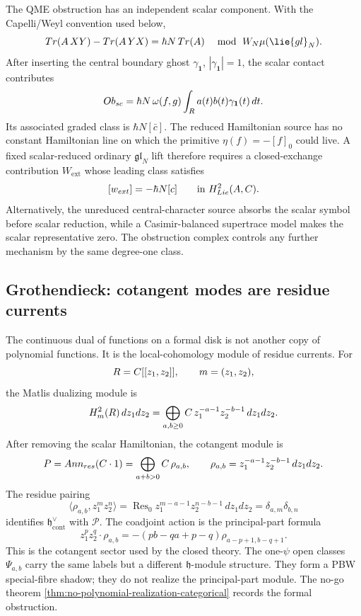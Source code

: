 The QME obstruction has an independent scalar component. With the
Capelli/Weyl convention used below,
\[
  \operatorname{Tr}(A\,XY)-\operatorname{Tr}(A\,YX)
  =\hbar N\,\operatorname{Tr}(A)
  \quad\bmod\ \mathcal W_N\widehat\mu(\lie{gl}_N).
\]
After inserting the central boundary ghost
\(\gamma_{\mathbf 1}\), \(|\gamma_{\mathbf 1}|=1\), the scalar contact
contributes
\[
  Ob_{sc}
  =
  \hbar N\,\omega(f,g)
  \int_{R} a(t)b(t)\gamma_{\mathbf 1}(t)\,dt .
\]
  Its associated graded class is \(\hbar N[\bar c]\). The reduced
  Hamiltonian source has no constant Hamiltonian line on which the
  primitive \(\eta(f)=-[f]_0\) could live.  A fixed scalar-reduced
  ordinary \(\mathfrak{gl}_N\) lift therefore requires a closed-exchange
  contribution \(W_{\mathrm{ext}}\) whose leading class satisfies
  \[
    [w_{ext}]=-\hbar N[c]
    \qquad\text{in }H^2_{Lie}(A,C).
  \]
  Alternatively, the unreduced central-character source absorbs the
  scalar symbol before scalar reduction, while a Casimir-balanced
  supertrace model makes the scalar representative zero.
  The obstruction complex controls any further mechanism by the same
  degree-one class.

\subsection{Grothendieck: cotangent modes are residue currents}

The continuous dual of functions on a formal disk is not another copy
of polynomial functions. It is the local-cohomology module of residue
currents. For
\[
  R=C[[z_1,z_2]],\qquad m=(z_1,z_2),
\]
the Matlis dualizing module is
\[
  H^2_{m}(R)\,dz_1dz_2
  =
  \bigoplus_{a,b\geq0}
  C\,z_1^{-a-1}z_2^{-b-1}\,dz_1dz_2 .
\]
After removing the scalar Hamiltonian, the cotangent module is
\[
  P
  =
  Ann_{res}(C\cdot1)
  =
  \bigoplus_{a+b>0}C\,\rho_{a,b},
  \qquad
  \rho_{a,b}=z_1^{-a-1}z_2^{-b-1}\,dz_1dz_2 .
\]
The residue pairing
\[
  \langle\rho_{a,b},z_1^m z_2^n\rangle
  =
  \operatorname{Res}_{0}
  z_1^{m-a-1}z_2^{n-b-1}\,dz_1dz_2
  =
  \delta_{a,m}\delta_{b,n}
\]
identifies \(\mathfrak h^\vee_{\mathrm{cont}}\) with \(\mathcal P\).
The coadjoint action is the principal-part formula
\[
  z_1^p z_2^q\cdot\rho_{a,b}
  =
  -(pb-qa+p-q)\rho_{a-p+1,b-q+1}.
\]
This is the cotangent sector used by the closed theory. The
one-\(\psi\) open classes \(\Psi_{a,b}\) carry the same labels but a
different \(\mathfrak h\)-module structure. They form a PBW
special-fibre shadow; they do not realize the principal-part module.
The no-go theorem
\ref{thm:no-polynomial-realization-categorical} records the formal
obstruction.

